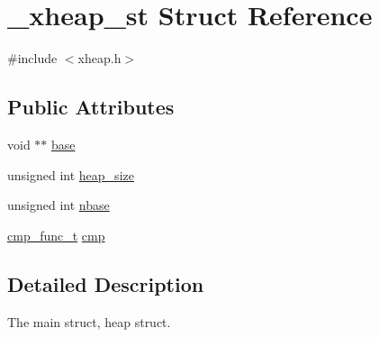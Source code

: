 \hypertarget{struct__xheap__st}{\section{\-\_\-xheap\-\_\-st Struct Reference}
\label{struct__xheap__st}
}


{\ttfamily \#include $<$xheap.\-h$>$}

\subsection*{Public Attributes}
\begin{DoxyCompactItemize}
\item 
void $\ast$$\ast$ \hyperlink{struct__xheap__st_a4450d71a55146caf53f09ab93729499d}{base}
\item 
unsigned int \hyperlink{struct__xheap__st_a50265dc661ba81a2a80060bd00ac02ac}{heap\-\_\-size}
\item 
unsigned int \hyperlink{struct__xheap__st_a9575d2abc2f8b1ca4b288df6e1c6bf3c}{nbase}
\item 
\hyperlink{xheap_8h_a37a557331e18cb3bf6ae46bf825cf603}{cmp\-\_\-func\-\_\-t} \hyperlink{struct__xheap__st_ad637fb712b236eb45356bd5ea9ec4de7}{cmp}
\end{DoxyCompactItemize}


\subsection{Detailed Description}
The main struct, heap struct. 

